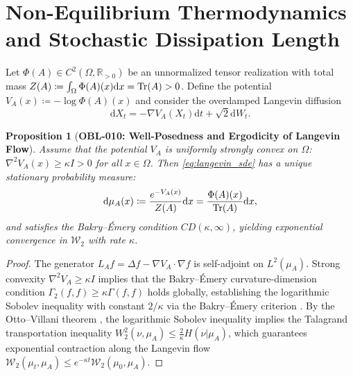 \documentclass[11pt,a4paper,reqno]{amsart}
\newtheorem{proposition}[theorem]{Proposition}
\theoremstyle{definition}
\theoremstyle{remark}
\numberwithin{equation}{section}
\newcommand{\dif}{\mathrm{d}}
\begin{document}
\section{Non-Equilibrium Thermodynamics and Stochastic Dissipation Length}
\label{sec:thermo}

Let $\Phi(A) \in C^2(\Omega, \mathbb{R}_{>0})$ be an unnormalized tensor realization with total mass $Z(A) \coloneqq \int_\Omega \Phi(A)(x) \dif x = \Tr(A) > 0$. Define the potential $V_A(x) \coloneqq -\log \Phi(A)(x)$ and consider the overdamped Langevin diffusion
\begin{equation}
\label{eq:langevin_sde}
\dif X_t = -\nabla V_A(X_t) \dif t + \sqrt{2} \dif W_t.
\end{equation}

\begin{proposition}[\textbf{OBL-010: Well-Posedness and Ergodicity of Langevin Flow}]
\label{prop:langevin_ergodicity}
Assume that the potential $V_A$ is uniformly strongly convex on $\Omega$: $\nabla^2 V_A(x) \ge \kappa I > 0$ for all $x \in \Omega$. Then \eqref{eq:langevin_sde} has a unique stationary probability measure:
\begin{equation}
\dif\mu_A(x) \coloneqq \frac{e^{-V_A(x)}}{Z(A)} \dif x = \frac{\Phi(A)(x)}{\Tr(A)} \dif x,
\end{equation}
and satisfies the Bakry--Émery condition $CD(\kappa, \infty)$, yielding exponential convergence in $\mathcal{W}_2$ with rate $\kappa$.
\end{proposition}

\begin{proof}
The generator $L_A f = \Delta f - \nabla V_A \cdot \nabla f$ is self-adjoint on $L^2(\mu_A)$. Strong convexity $\nabla^2 V_A \ge \kappa I$ implies that the Bakry--Émery curvature-dimension condition $\Gamma_2(f, f) \ge \kappa \Gamma(f, f)$ holds globally, establishing the logarithmic Sobolev inequality with constant $2/\kappa$ via the Bakry--Émery criterion \cite{BakryEmery1985}. By the Otto--Villani theorem \cite{OttoVillani2000}, the logarithmic Sobolev inequality implies the Talagrand transportation inequality $W_2^2(\nu, \mu_A) \le \frac{2}{\kappa} H(\nu | \mu_A)$, which guarantees exponential contraction along the Langevin flow $\mathcal{W}_2(\mu_t, \mu_A) \le e^{-\kappa t} \mathcal{W}_2(\mu_0, \mu_A)$.
\end{proof}
\end{document}
